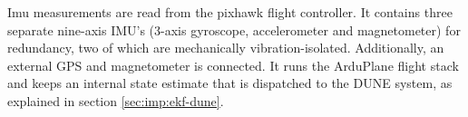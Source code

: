     Imu measurements are read from the pixhawk flight controller. It contains three separate nine-axis IMU's (3-axis gyroscope, accelerometer and magnetometer) for redundancy, two of which are mechanically vibration-isolated. Additionally, an external GPS and magnetometer is connected. It runs the ArduPlane flight stack and keeps an internal state estimate that is dispatched to the DUNE system, as explained in section \ref{sec:imp:ekf-dune}. 
    
    
    



